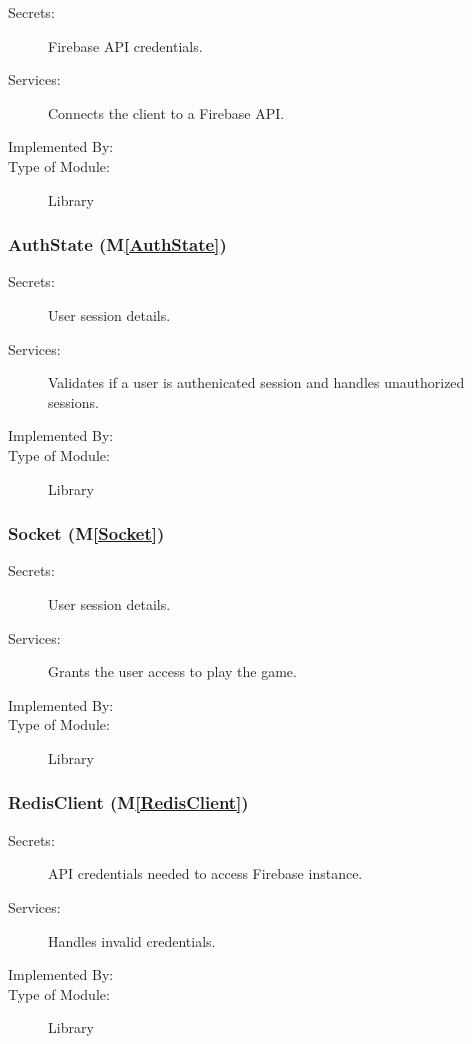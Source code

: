 \documentclass[12pt, titlepage]{article}
\newcommand{\mref}[1]{M\ref{#1}}
\begin{document}
\begin{description}
\item[Secrets:] Firebase API credentials.
\item[Services:] Connects the client to a Firebase API.
\item[Implemented By:]  \progname
\item[Type of Module:] Library
\end{description}


\subsubsection{AuthState (\mref{AuthState})}

\begin{description}
\item[Secrets:] User session details.
\item[Services:] Validates if a user is authenicated session and handles unauthorized sessions.
\item[Implemented By:]  \progname
\item[Type of Module:] Library
\end{description}

\subsubsection{Socket (\mref{Socket})}

\begin{description}
\item[Secrets:] User session details.
\item[Services:] Grants the user access to play the game.
\item[Implemented By:]  \progname
\item[Type of Module:] Library
\end{description}

\subsubsection{RedisClient (\mref{RedisClient})}

\begin{description}
\item[Secrets:] API credentials needed to access Firebase instance.
\item[Services:] Handles invalid credentials.
\item[Implemented By:]  \progname
\item[Type of Module:] Library
\end{description}
\end{document}
